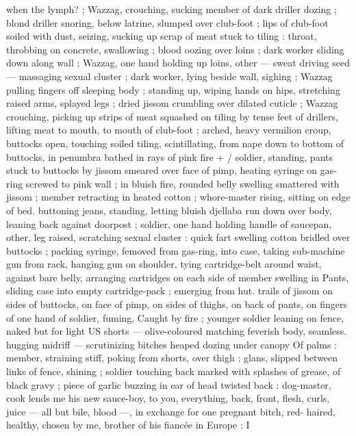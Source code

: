 when the lymph?{\td} {\gr} ; Wazzag, crouching, sucking member of dark 
driller dozing ; blond driller snoring, below latrine, slumped over 
club-foot ; lips of club-foot soiled with dust, seizing, sucking up 
scrap of meat stuck to tiling : throat, throbbing on concrete, 
swallowing ; blood oozing over loins ; dark worker sliding down along 
wall ; Wazzag, one hand holding up loins, other --- sweat driving 
seed --- massaging sexual cluster ; dark worker, lying beside wall, 
sighing ; Wazzag pulling fingers off sleeping body ; standing up, 
wiping hands on hips, stretching raised arms, splayed legs ; dried 
jissom crumbling over dilated cuticle ; Wazzag crouching, picking up 
strips of meat squashed on tiling by tense feet of drillers, lifting 
meat to mouth, to mouth of club-foot ; arched, heavy vermilion 
croup, buttocks open, touching soiled tiling, scintillating, from nape 
down to bottom of buttocks, in penumbra bathed in rays of pink fire 
+ {\slash} soldier, standing, pants stuck to buttocks by jissom smeared over 
face of pimp, heating syringe on gas-ring screwed to pink wall ; in 
bluish fire, rounded belly swelling smattered with jissom ; member 
retracting in heated cotton ; whore-master rising, sitting on edge of 
bed. buttoning jeans, standing, letting bluish djellaba run down over 
body, leaning back against doorpost ; soldier, one hand holding 
handle of saucepan, other, leg raised, scratching sexual cluster : 
quick fart swelling cotton bridled over buttocks ; packing syringe, 
femoved from gas-ring, into case, taking sub-machine gun from rack, 
hanging gun on shoulder, tying cartridge-belt around waist, against 
bare belly, arranging cartridges on each side of member swelling in 
Pants, sliding case into empty cartridge-pack ; emerging from hut. 
trails of jissom on sides of buttocks, on face of pimp, on sides of 
thighs, on back of pants, on fingers of one hand of soldier, fuming, 
Caught by fire ; younger soldier leaning on fence, naked but for light 
US shorts --- olive-coloured matching feverish body, seamless. 
hugging midriff --- scrutinizing bitches heaped dozing under canopy 
Of palms : member, straining stiff, poking from shorts, over thigh ; 
glans, slipped between links of fence, shining ; soldier touching back 
marked with splashes of grease, of black gravy ; piece of garlic 
buzzing in ear of head twisted back : {\gl}{\td} dog-master, cook lends me 
his new sauce-boy, to you, everything, back, front, flesh, curls, juice 
--- all but bile, blood ---, in exchange for one pregnant bitch, red- 
haired, healthy, chosen by me, brother of his fiancée in Europe : I 
